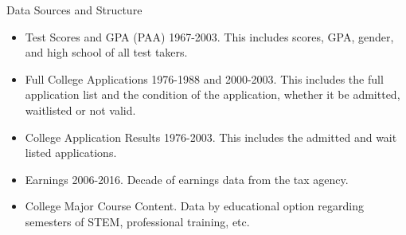 \documentclass[table,10pt]{beamer}
\begin{document}
\begin{frame}{Data Sources and Structure} %
\centering

\begin{itemize}

\item<2-3> \alert{Test Scores and GPA (PAA)} 1967-2003. This includes scores, GPA, gender, and high school of all test takers.\medskip
{}



\item<4> \alert{Full College Applications} 1976-1988 and 2000-2003. This includes the full application list and the condition of the application, whether it be admitted, waitlisted or not valid.\medskip


\item<5>  \alert{College Application Results} 1976-2003. This includes the admitted and wait listed applications.\medskip

\item<6>  \alert{Earnings} 2006-2016.  Decade of earnings data from the tax agency.\medskip
%
\item<7>  \alert{College Major Course Content.} Data by educational option regarding semesters of STEM, professional training, etc.  \medskip
\end{itemize}



\end{frame}

%
%





%
\end{document}
